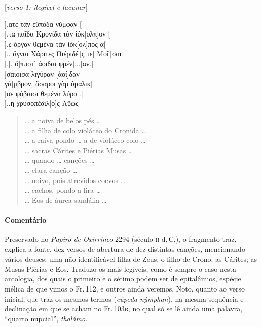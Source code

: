 \begin{gkverse}
\textnormal{[\emph{verso 1: ilegível e lacunar}]}

].ατε τὰν εὔποδα νύμφαν [\\
].τα παῖδα Κρονίδα τὰν ἰόκ[ολπ]ον [\\
].ς ὄργαν θεμένα τὰν ἰόκ[ολ]πος α[\\
 ].. ἄγναι Χάριτες Πιέριδέ\,[ς τε] Μοῖ\,[σαι\\
     ].[. ὄ]πποτ’ ἀοιδαι φρέν[...]αν.[\\
             ]σαιοισα λιγύραν [ἀοί]δαν\\
         γά]μβρον, ἄσαροι γὰρ ὐμαλικ[\\
  ]σε φόβαισι θεμένα λύρα .[\\
  ]..η χρυσοπέδιλ[ο]ς Αὔως
\end{gkverse}

\begin{verse}
\ldots{} a noiva de belos pés \ldots{}\\
\ldots{} a filha de colo violáceo do Cronida \ldots{}\\
\ldots{} a raiva pondo \ldots{} a de violáceo colo \ldots{}\\
\ldots{} sacras Cárites e Piérias Musas \ldots{}\\
\ldots{} quando \ldots{} canções \ldots{}\\
\ldots{} clara canção \ldots{}\\
\ldots{} noivo, pois atrevidos coevos \ldots{}\\
\ldots{} cachos, pondo a lira \ldots{}\\
\ldots{} Eos de áurea sandália \ldots{}\\
\end{verse}

\medskip

\paragraph{Comentário} Preservado  no \emph{Papiro de Oxirrinco} 2294 (século \textsc{ii} d.\,C.), o fragmento traz, explica a fonte, dez versos de abertura de dez distintas canções, mencionando vários deuses: uma não identificável filha de Zeus, o filho de Crono; as Cárites; as Musas Piérias e Eos. Traduzo os mais legíveis, como é sempre o caso nesta antologia, dos quais o primeiro e o sétimo podem ser de epitalâmios, espécie mélica de que vimos o Fr.\,112, e outros ainda veremos.
Noto, quanto ao verso inicial, que traz os mesmos termos (\emph{eúpoda nýmphan}), na mesma sequência e declinação em que se acham no Fr.\,103\textsc{b}, no qual só se lê ainda uma palavra, ``quarto nupcial'', \emph{thalámō}.


